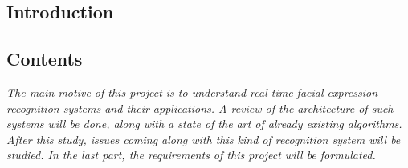   \begin{titlepage}
    \vspace*{\fill}
      \part{Introduction}
    \vspace*{\fill}
  \end{titlepage}

\startcontents[parts]

\chapter*{Contents}

\textit{The main motive of this project is to understand real-time facial expression recognition systems and their applications. A review of the architecture of such systems will be done, along with a state of the art of already existing algorithms. After this study, issues coming along with this kind of recognition system will be studied. In the last part, the requirements of this project will be formulated.}

\vspace{\baselineskip}


\pagebreak


\newpage


\stopcontents[parts]
